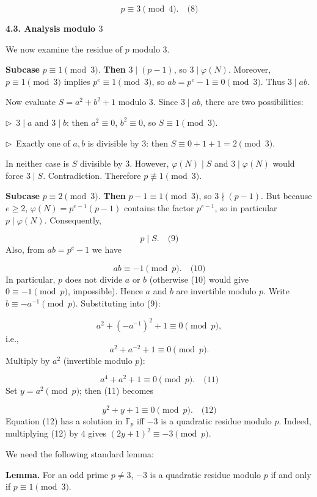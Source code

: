 \documentclass{llmxive}
\providecommand{\solutionheading}[1]{\par\smallskip\noindent\textbf{#1}\par}
\providecommand{\compactbullet}[1]{\par\noindent$\triangleright$~#1\par}
\begin{document}
\[
p \equiv 3 \pmod{4}. \quad\text{(8)}
\]
\solutionheading{4.3. Analysis modulo \(3\)}
We now examine the residue of \(p\) modulo \(3\).\par
\textbf{Subcase }\(p \equiv 1 \pmod{3}\).\textbf{ Then }\(3 \mid (p-1)\), so \(3 \mid \varphi(N)\). Moreover, \(p \equiv 1 \pmod{3}\) implies \(p^{e} \equiv 1 \pmod{3}\), so \(ab = p^{e} - 1 \equiv 0 \pmod{3}\). Thus \(3 \mid ab\).\par
Now evaluate \(S = a^{2}+b^{2}+1\) modulo \(3\). Since \(3 \mid ab\), there are two possibilities:\par
\compactbullet{\(3 \mid a\) and \(3 \mid b\): then \(a^{2}\equiv0\), \(b^{2}\equiv0\), so \(S \equiv 1 \pmod{3}\).}
\compactbullet{Exactly one of \(a,b\) is divisible by \(3\): then \(S \equiv 0+1+1 = 2 \pmod{3}\).}
In neither case is \(S\) divisible by \(3\). However, \(\varphi(N) \mid S\) and \(3 \mid \varphi(N)\) would force \(3 \mid S\). Contradiction. Therefore \(p \not\equiv 1 \pmod{3}\).\par
\textbf{Subcase }\(p \equiv 2 \pmod{3}\).\textbf{ Then }\(p-1 \equiv 1 \pmod{3}\), so \(3 \nmid (p-1)\). But because \(e \ge 2\), \(\varphi(N) = p^{e-1}(p-1)\) contains the factor \(p^{e-1}\), so in particular \(p \mid \varphi(N)\). Consequently,\par
\[
p \mid S. \quad\text{(9)}
\]
Also, from \(ab = p^{e} - 1\) we have\par
\[
ab \equiv -1 \pmod{p}. \quad\text{(10)}
\]
In particular, \(p\) does not divide \(a\) or \(b\) (otherwise (10) would give \(0 \equiv -1 \pmod{p}\), impossible). Hence \(a\) and \(b\) are invertible modulo \(p\). Write \(b \equiv -a^{-1} \pmod{p}\). Substituting into (9):\par
\[
a^{2} + (-a^{-1})^{2} + 1 \equiv 0 \pmod{p},
\]
i.e.,
\[
a^{2} + a^{-2} + 1 \equiv 0 \pmod{p}.
\]
Multiply by \(a^{2}\) (invertible modulo \(p\)):\par
\[
a^{4} + a^{2} + 1 \equiv 0 \pmod{p}. \quad\text{(11)}
\]
Set \(y = a^{2} \pmod{p}\); then (11) becomes\par
\[
y^{2} + y + 1 \equiv 0 \pmod{p}. \quad\text{(12)}
\]
Equation (12) has a solution in \(\mathbb{F}_p\) iff \(-3\) is a quadratic residue modulo \(p\). Indeed, multiplying (12) by \(4\) gives \((2y+1)^{2} \equiv -3 \pmod{p}\).\par
We need the following standard lemma:\par
\textbf{Lemma.} For an odd prime \(p \neq 3\), \(-3\) is a quadratic residue modulo \(p\) if and only if \(p \equiv 1 \pmod{3}\).\par
\end{document}
